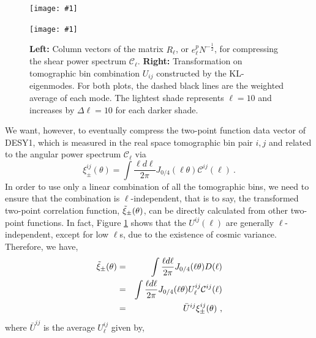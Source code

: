 \documentclass[twocolumn,nofootinbib]{\docclass}
\newcommand{\sfig}[2]{
	\texttt{[image: \#1]}
}
\newcommand{\rf}[1]{Figure \ref{fig:#1}}
\def\bea{\begin{eqnarray}}
\def\eea{\end{eqnarray}}
\newcommand\ctot{\mathcal{C}}
\begin{document}
	\begin{figure}[thbp]
	    \sfig{figures/epi.png}{0.8\columnwidth}
	    \sfig{figures/Wij.png}{1.02\columnwidth}
		\caption{\textbf{Left:} Column vectors of the matrix $R_{\ell}$, or $e^p_{\ell} N^{-\frac{1}{2}}$, for compressing the shear power spectrum $\ctot_{\ell}$. %
		\textbf{Right:} Transformation on tomographic bin combination $U_{ij}$ constructed by the KL-eigenmodes. For both plots, the dashed black lines are the weighted average of each mode. The lightest shade represents $\ell = 10$ and increases by $\Delta \ell = 10$ for each darker shade. \label{fig:kl-mode}}
	\end{figure}
	
	We want, however, to eventually compress the two-point function data vector of DESY1, which is measured in the real space tomographic bin pair ${i, j}$ and related to the angular power spectrum $\ctot_{\ell}$ via
	\begin{equation*}
	\xi_{\pm}^{ij}(\theta) = \int \frac{\ell d \ell }{2\pi}J_{0/4}(\ell \theta) \ctot^{ij}(\ell)\ 
	.\end{equation*}
	In order to use only a linear combination of all the tomographic bins, we need to ensure that the combination is $\ell$-independent, that is to say, the transformed two-point correlation function, $\Tilde{\xi}_{\pm}(\theta)$, can be directly calculated from other two-point functions. In fact, \rf{kl-mode} shows that the $U^{ij}(\ell)$ are generally $\ell$-independent, except for low $\ell$s, due to the existence of cosmic variance. Therefore, we have, 
	\bea
	\nonumber\Tilde{\xi}_{\pm}(\theta) &=& \int \frac{\ell d \ell }{2\pi}J_{0/4}(\ell \theta) D(\ell)\\\nonumber
	&=&\int \frac{\ell d \ell }{2\pi}J_{0/4}(\ell \theta) U^{ij}_\ell \ctot^{ij}(\ell)\\
	&=&\bar{U}^{ij}\xi_{\pm}^{ij}(\theta)\
	,\eea
	where $\bar{U}^{ij}$ is the average $U^{ij}_{\ell}$ given by,%
\end{document}
